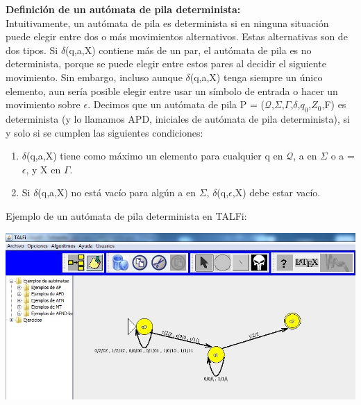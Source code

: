 \documentclass[12pt,a4paper,spanish]{book}
\begin{document}
\begin{itemize}
{\bf Definici\'on de un aut\'omata de pila determinista:\\}
\newline
Intuitivamente, un aut\'omata de pila es determinista si en ninguna situaci\'on
puede elegir entre dos o m\'as movimientos alternativos. Estas alternativas son
de dos tipos. Si $\delta$(q,a,X) contiene m\'as de un par, el aut\'omata de pila es
no determinista, porque se puede elegir entre estos pares al decidir el siguiente
movimiento. Sin embargo, incluso aunque $\delta$(q,a,X) tenga siempre un
\'unico elemento, aun ser\'ia posible elegir entre usar un s\'imbolo de entrada o
hacer un movimiento sobre $\epsilon$. Decimos que un aut\'omata de pila P =
($\mathcal{Q}$,$\Sigma$,$\Gamma$,$\delta$,$q_{0}$,$Z_{0}$,F) es determinista (y lo llamamos
APD, iniciales de aut\'omata de pila determinista), si y solo si se cumplen las
siguientes condiciones:
\begin{enumerate}
\item $\delta$(q,a,X) tiene como m\'aximo un elemento para cualquier q en $\mathcal{Q}$, a en
$\Sigma$ o a = $\epsilon$, y X en $\Gamma$.
\item Si $\delta$(q,a,X) no est\'a vac\'io para alg\'un a en $\Sigma$,
$\delta$(q,$\epsilon$,X) debe estar vac\'io.\newline \newline \newline \newline \newline \newline \newline 
\end{enumerate}
\end{itemize}

Ejemplo de un aut\'omata de pila determinista en TALFi:\\
\begin{center}
\includegraphics[width=\textwidth]{apd.jpg}
\end{center}
\end{document}

